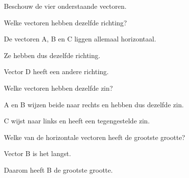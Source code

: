 \documentclass{ximera}
\begin{document}
\begin{oefening}{\oefU}

Beschouw de vier onderstaande vectoren.

\begin{center}
\end{center}


\begin{question}
Welke vectoren hebben dezelfde richting?

\begin{oplossing}
De vectoren A, B en C liggen allemaal horizontaal.

Ze hebben dus dezelfde richting.

Vector D heeft een andere richting.
\end{oplossing}
\end{question}


\begin{question}
Welke vectoren hebben dezelfde zin?

\begin{oplossing}
A en B wijzen beide naar rechts en hebben dus dezelfde zin.

C wijst naar links en heeft een tegengestelde zin.
\end{oplossing}
\end{question}


\begin{question}
Welke van de horizontale vectoren heeft de grootste grootte?

\begin{oplossing}
Vector B is het langst.

Daarom heeft B de grootste grootte.
\end{oplossing}
\end{question}

\end{oefening}
\end{document}
